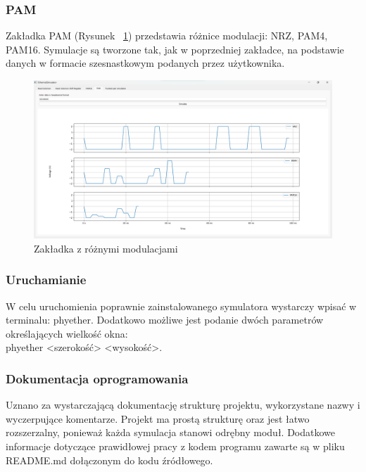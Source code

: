 \subsubsection{PAM}

Zakładka PAM (Rysunek ~\ref{fig:pam_sim_png}) przedstawia różnice modulacji: NRZ, PAM4, PAM16. Symulacje są tworzone tak, jak w poprzedniej zakładce, na podstawie danych w formacie szesnastkowym podanych przez użytkownika.

\begin{figure}[H]
    \centering
    \includegraphics[width=\textwidth]{images/pam_tab.png}
    \caption{Zakładka z różnymi modulacjami}
    \label{fig:pam_sim_png}
\end{figure}

\subsubsection{Uruchamianie}
W celu uruchomienia poprawnie zainstalowanego symulatora wystarczy wpisać w terminalu: phyether. Dodatkowo możliwe jest podanie dwóch parametrów określających wielkość okna: \\ phyether <szerokość> <wysokość>.

\subsubsection{Dokumentacja oprogramowania}
Uznano za wystarczającą dokumentację strukturę projektu, wykorzystane nazwy i wyczerpujące komentarze. Projekt ma prostą strukturę oraz jest łatwo rozszerzalny, ponieważ każda symulacja stanowi odrębny moduł. Dodatkowe informacje dotyczące prawidłowej pracy z kodem programu zawarte są w pliku README.md dołączonym do kodu źródłowego.
